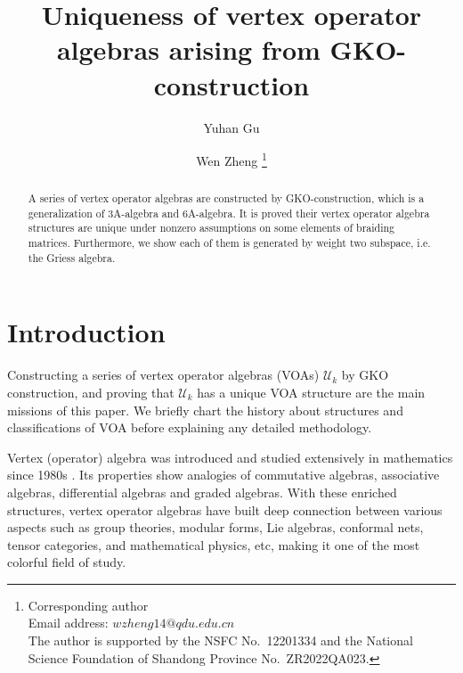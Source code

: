 \documentclass{article}
\begin{document}
	\title{Uniqueness of vertex operator algebras
		arising from GKO-construction}
	
	\author{Yuhan Gu}
	\author{Wen Zheng
		\footnote{Corresponding author\\
			Email address: $wzheng14@qdu.edu.cn$\\
			The author is supported by the NSFC No.~12201334 and the National Science Foundation of Shandong Province No.~ZR2022QA023.}}
	
	\maketitle
	
	\begin{abstract}
		A series of vertex operator algebras are constructed 
		by 
		GKO-construction, which is a generalization of 3A-algebra and 6A-algebra. 
		It is proved their vertex operator algebra structures are unique under nonzero assumptions on some elements of braiding matrices.
		Furthermore, we show each of them is generated by weight two subspace, i.e. the Griess algebra.
	\end{abstract}
	
	\setcounter{tocdepth}{2}
	\tableofcontents
	
	
	
	\newpage
	
	\section{Introduction}
	Constructing a series of vertex operator algebras (VOAs) $\mathcal{U}_k$ by GKO construction,
	and proving that $\mathcal{U}_k$ has a unique VOA structure
	are the main missions of this paper. 
	We briefly chart the history about structures and classifications of VOA
	before explaining any detailed methodology.
	
	Vertex (operator) algebra was introduced and studied
	extensively in mathematics 
	since 1980s \cite{B,FLM,FHL}. 
	Its properties show analogies of 
	commutative algebras, associative algebras,
	differential algebras and graded algebras.
	With these enriched structures,
	vertex operator algebras have built 
	deep connection between various aspects such as 
	group theories, modular forms, Lie algebras, 
	conformal nets, 
	tensor categories, and mathematical physics, etc,
	making it one of the most colorful field of study.
	
\end{document}
